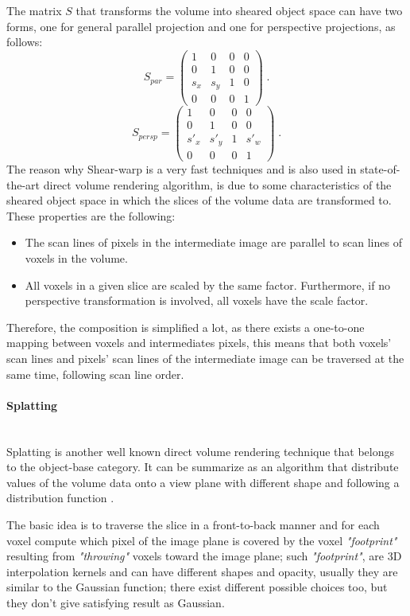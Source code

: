 \documentclass[12pt,a4paper]{extarticle}
\newcommand{\linespace}{\vspace{0pt}}
\newcommand{\myparagraph}[1]{\paragraph{#1}\mbox{}\\}
\begin{document}
The matrix $S$ that transforms the volume into sheared object space can have two forms, one for general parallel projection and one for perspective projections, as follows: 
\[
S_{par}
=
\begin{pmatrix}
1 & 0 & 0 & 0\\
0 & 1 & 0 & 0\\
s_{x}&s_{y}& 1 & 0\\
0& 0 &0 &1
\end{pmatrix} \;.
\]
\[
S_{persp}
=
\begin{pmatrix}
1 & 0 & 0 & 0\\
0 & 1 & 0 & 0\\
s'_{x}&s'_{y}& 1 & s'_{w}\\
0& 0 &0 &1
\end{pmatrix}\;.
\]
The reason why Shear-warp is a very fast techniques and is also used in state-of-the-art direct volume rendering algorithm, is due to some characteristics of the sheared object space in which the slices of the volume data are transformed to.
These properties are the following:
\begin{itemize}
\item The scan lines \cite{jack_tsatsulin_2002} of pixels in the intermediate image are parallel to scan lines of voxels in the volume.
\item All voxels in a given slice are scaled by the same factor. Furthermore, if no perspective transformation is involved, all voxels have the scale factor.
\end{itemize}
Therefore, the composition is simplified a lot, as there exists a one-to-one mapping between voxels and intermediates pixels, this means that both voxels' scan lines and pixels' scan lines of the intermediate image can be traversed at the same time, following scan line order.

\myparagraph{Splatting} Splatting is another well known direct volume rendering technique that belongs to the object-base category. It can be summarize as an algorithm that distribute values of the volume data onto a view plane with different shape and following a distribution function \cite{PFISTER2005229}.
\linespace

The basic idea is to traverse the slice in a front-to-back manner and for each voxel compute which pixel of the image plane is covered by the voxel \textit{"footprint"} resulting from \textit{"throwing"} voxels toward the image plane; such \textit{"footprint"}, are 3D interpolation kernels and can have different shapes and opacity, usually they are similar to the Gaussian function; there exist different possible choices too, but they don't give satisfying result as Gaussian.
\end{document}
